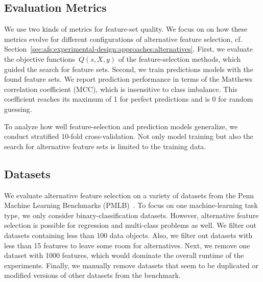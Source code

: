 \documentclass{article}
\theoremstyle{definition}
\begin{document}
\subsection{Evaluation Metrics}
\label{sec:afs:experimental-design:evaluation}

We use two kinds of metrics for feature-set quality.
We focus on on how these metrics evolve for different configurations of alternative feature selection, cf. Section~\ref{sec:afs:experimental-design:approaches:alternatives}.
First, we evaluate the objective functions~$Q(s,X,y)$ of the feature-selection methods, which guided the search for feature sets.
Second, we train predictions models with the found feature sets.
We report prediction performance in terms of the Matthews correlation coefficient (MCC), which is insensitive to class imbalance.
This coefficient reaches its maximum of 1 for perfect predictions and is 0 for random guessing.

To analyze how well feature-selection and prediction models generalize, we conduct stratified 10-fold cross-validation.
Not only model training but also the search for alternative feature sets is limited to the training data.

\subsection{Datasets}
\label{sec:afs:experimental-design:datasets}

We evaluate alternative feature selection on a variety of datasets from the Penn Machine Learning Benchmarks (PMLB)~\cite{olson2017pmlb,romano2021pmlb}.
To focus on one machine-learning task type, we only consider binary-classification datasets.
However, alternative feature selection is possible for regression and multi-class problems as well.
We filter out datasets containing less than 100 data objects.
Also, we filter out datasets with less than 15 features to leave some room for alternatives.
Next, we remove one dataset with 1000 features, which would dominate the overall runtime of the experiments.
Finally, we manually remove datasets that seem to be duplicated or modified versions of other datasets from the benchmark.
\end{document}
